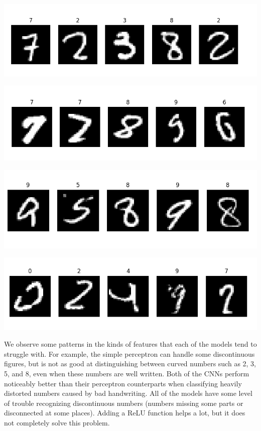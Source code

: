 \documentclass{article}
\begin{document}
\hspace{-0.3in}
\begin{minipage}{0.52\linewidth}
\includegraphics[width = \linewidth]{A1.png}
\end{minipage}
\begin{minipage}{0.52\linewidth}
\includegraphics[width = \linewidth]{B1.png}
\end{minipage}

\hspace{-0.3in}
\begin{minipage}{0.52\linewidth}
\includegraphics[width = \linewidth]{C1.png}
\end{minipage}
\begin{minipage}{0.52\linewidth}
\includegraphics[width = \linewidth]{D1.png}
\end{minipage}

We observe some patterns in the kinds of features that each of the models tend to struggle with. For example, the simple perceptron can handle some discontinuous figures, but is not as good at distinguishing between curved numbers such as 2, 3, 5, and 8, even when these numbers are well written. Both of the CNNs perform noticeably better than their perceptron counterparts when classifying heavily distorted numbers caused by bad handwriting. All of the models have some level of trouble recognizing discontinuous numbers (numbers missing some parts or disconnected at some places). Adding a ReLU function helps a lot, but it does not completely solve this problem.
\end{document}
